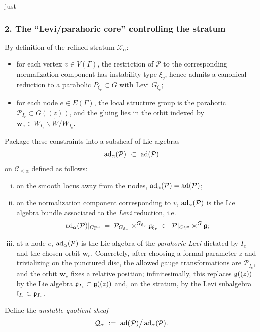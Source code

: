 just \documentclass[12pt]{article}
\DeclareMathOperator{\sm}{sm}
\begin{document}
\subsubsection*{2. The ``Levi/parahoric core'' controlling the stratum}

By definition of the refined stratum $\mathcal X_\alpha$:

\begin{itemize}
\item for each vertex $v\in V(\Gamma)$, the restriction of $\mathcal P$
to the corresponding normalization component has instability type $\xi_v$,
hence admits a canonical reduction to a parabolic $P_{\xi_v}\subset G$
with Levi $G_{\xi_v}$;

\item for each node $e\in E(\Gamma)$, the local structure group is the
parahoric $\mathcal P_{I_e}\subset G((z))$, and the gluing lies in the orbit
indexed by $\mathbf w_e\in W_{I_e}\backslash\widetilde W/W_{I_e}$.
\end{itemize}

Package these constraints into a subsheaf of Lie algebras
\[
\operatorname{ad}_\alpha(\mathcal P)\ \subset\ \operatorname{ad}(\mathcal P)
\]
on $\mathcal C_{\le\alpha}$ defined as follows:

\begin{enumerate}[(i)]
\item on the smooth locus away from the nodes, $\operatorname{ad}_\alpha(\mathcal P)=\operatorname{ad}(\mathcal P)$;

\item on the normalization component corresponding to $v$, $\operatorname{ad}_\alpha(\mathcal P)$
is the Lie algebra bundle associated to the \emph{Levi} reduction, i.e.
\[
\ad_\alpha(\mathcal P)|_{C_v^{\sm}}
\;=\;
\mathcal P_{G_{\xi_v}}\times^{G_{\xi_v}} \mf g_{\xi_v}
\ \subset\
\mathcal P|_{C_v^{\sm}}\times^G \mf g;
\]

\item at a node $e$, $\operatorname{ad}_\alpha(\mathcal P)$ is the Lie algebra of the
\emph{parahoric Levi} dictated by $I_e$ and the chosen orbit $\mathbf w_e$.
Concretely, after choosing a formal parameter $z$ and trivializing on the punctured
disc, the allowed gauge transformations are $\mathcal P_{I_e}$, and the orbit
$\mathbf w_e$ fixes a relative position; infinitesimally, this replaces
$\mathfrak{g}((z))$ by the Lie algebra $\mathfrak{p}_{I_e}\subset \mathfrak{g}((z))$ and, on the stratum,
by the Levi subalgebra $\mathfrak{l}_{I_e}\subset \mathfrak{p}_{I_e}$.
\end{enumerate}

Define the \emph{unstable quotient sheaf}
\[
\mathcal Q_\alpha\ :=\ \operatorname{ad}(\mathcal P)\big/\operatorname{ad}_\alpha(\mathcal P).
\]
\end{document}
